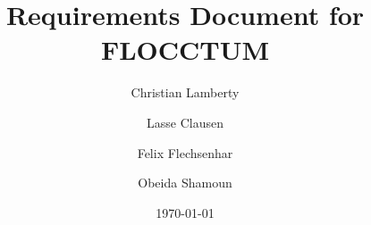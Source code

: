 \documentclass{book}
\title{Requirements Document for FLOCCTUM}
\author{Christian Lamberty \and Lasse Clausen \and Felix Flechsenhar \and Obeida Shamoun}
\date{\today}
\begin{document}

\maketitle


\printglossaries

\tableofcontents




\end{document}
